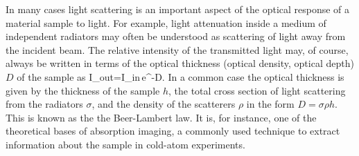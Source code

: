 
In many cases light scattering is an important aspect of the optical response of a material sample to light. For example, light attenuation inside a medium of independent radiators may often be understood as scattering of light away from the incident beam. The relative intensity of the transmitted light may, of course, always be written in terms of the optical thickness (optical density, optical depth) $D$ of the sample as
\bea
I_{out}=I_{in}\,e^{-D}.
\label{BEER'S_LAW}
\eea
In a common case the optical thickness is given by the thickness of the sample $h$, the total cross section of light scattering from the radiators $\sigma$, and the density of the scatterers $\rho$ in the form $D=\sigma\rho h$. This is known as the the Beer-Lambert law. It is, for instance, one of the theoretical bases of absorption imaging, a commonly used technique to extract information about the sample in cold-atom experiments. 








